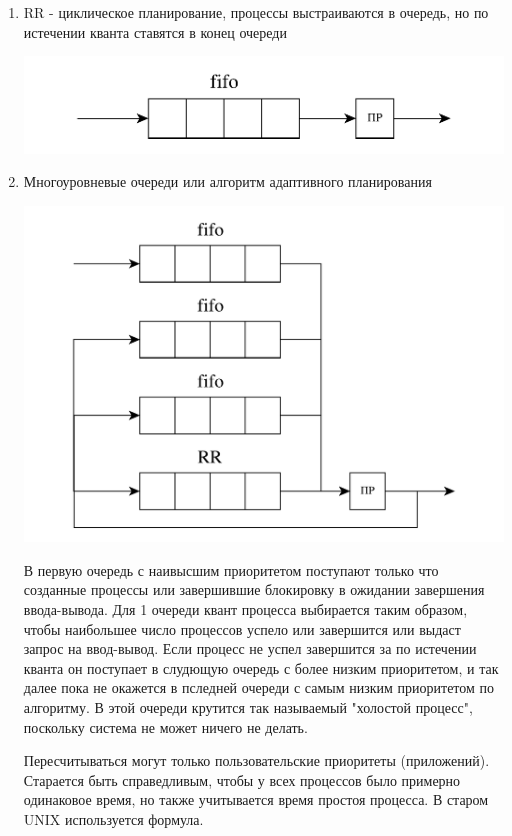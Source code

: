 \documentclass[a4paper, 14pt]{report}
\begin{document}
\begin{enumerate}
    \item RR - циклическое планирование, процессы выстраиваются в очередь, но по истечении кванта ставятся в конец очереди

        \includegraphics[scale=0.4]{os5}

    \item Многоуровневые очереди или алгоритм адаптивного планирования

        \includegraphics[scale=0.4]{os6}

        В первую очередь с наивысшим приоритетом поступают только что созданные процессы или завершившие блокировку в ожидании завершения ввода-вывода. Для 1 очереди квант процесса выбирается таким образом, чтобы наибольшее число процессов успело или завершится или выдаст запрос на ввод-вывод. Если процесс не успел завершится за по истечении кванта он поступает в слудющую очередь с более низким приоритетом, и так далее пока не окажется в пследней очереди с самым низким приоритетом по алгоритму. В этой очереди крутится так называемый "холостой процесс", поскольку система не может ничего не делать.

        Пересчитываться могут только пользовательские приоритеты (приложений). Старается быть справедливым, чтобы у всех процессов было примерно одинаковое время, но также учитывается время простоя процесса. В старом UNIX используется формула.
\end{enumerate}
\end{document}
